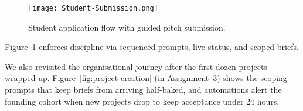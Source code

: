 \begin{figure}[H]
  \centering
  \texttt{[image: Student-Submission.png]}
  \caption{Student application flow with guided pitch submission.}
  \label{fig:application-flow}
\end{figure}

Figure~\ref{fig:application-flow} enforces discipline via sequenced prompts, live status, and scoped briefs.

We also revisited the organisational journey after the first dozen projects wrapped up. Figure~\ref{fig:project-creation} (in Assignment~3) shows the scoping prompts that keep briefs from arriving half-baked, and automations alert the founding cohort when new projects drop to keep acceptance under 24 hours.
